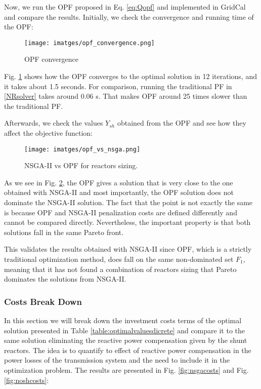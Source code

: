 \documentclass[a4paper,11pt, titlepage, twoside]{article}
\begin{document}
Now, we run the OPF proposed in Eq. \ref{eq:Qopf} and implemented in GridCal and compare the results. Initially, we check the convergence and running time of the OPF:
\begin{figure}[H]
    \centering
    \texttt{[image: imatges/opf\_convergence.png]}
    \caption{OPF convergence}
    \label{fig:opfconv}   
\end{figure}

Fig. \ref{fig:opfconv} shows how the OPF converges to the optimal solution in 12 iterations, and it takes about 1.5 seconds. For comparison, running the traditional PF in \ref{NRsolver} takes around 0.06 s.
That makes OPF around 25 times slower than the traditional PF.



Afterwards, we check the values $Y_{sh}$ obtained from the OPF and see how they affect the objective function:
\begin{figure}[H]
    \centering
    \texttt{[image: imatges/opf\_vs\_nsga.png]}
    \caption{NSGA-II vs OPF for reactors sizing.}
    \label{fig:opfvsnsga}   
\end{figure}

As we see in Fig. \ref{fig:opfvsnsga}, the OPF gives a solution that is very close to the one obtained with NSGA-II and most importantly, the OPF solution does not dominate the NSGA-II solution. The fact that the point is not exactly the same is because OPF and NSGA-II penalization costs are defined differently and
cannot be compared directly. Nevertheless, the important property is that both solutions fall in the same Pareto front.

This validates the results obtained with NSGA-II since OPF, which is a strictly traditional optimization method, does fall on the same non-dominated set $F_1$, meaning that it has not found a combination of reactors sizing that Pareto 
dominates the solutions from NSGA-II.

\subsubsection{Costs Break Down}

In this section we will break down the investment costs terms of the optimal solution presented in Table \ref{table:optimalvaluesdicrete} and compare it to the same solution eliminating the reactive power compensation given by the shunt reactors. The idea is to quantify to effect of reactive power compensation
in the power losses of the transmission system and the need to include it in the optimization problem. The results are presented in Fig. \ref{fig:nsgacosts} and Fig. \ref{fig:noshcosts}:
\end{document}
